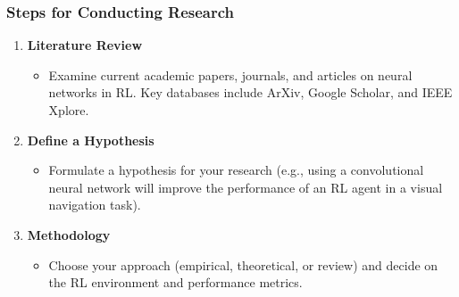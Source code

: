 \documentclass[aspectratio=169]{beamer}
\begin{document}
\begin{frame}[fragile]
    \frametitle{Steps for Conducting Research}
    \begin{enumerate}
        \item \textbf{Literature Review}
        \begin{itemize}
            \item Examine current academic papers, journals, and articles on neural networks in RL. Key databases include ArXiv, Google Scholar, and IEEE Xplore.
        \end{itemize}

        \item \textbf{Define a Hypothesis}
        \begin{itemize}
            \item Formulate a hypothesis for your research (e.g., using a convolutional neural network will improve the performance of an RL agent in a visual navigation task).
        \end{itemize}
        
        \item \textbf{Methodology}
        \begin{itemize}
            \item Choose your approach (empirical, theoretical, or review) and decide on the RL environment and performance metrics.
        \end{itemize}
    \end{enumerate}
\end{frame}
\end{document}
